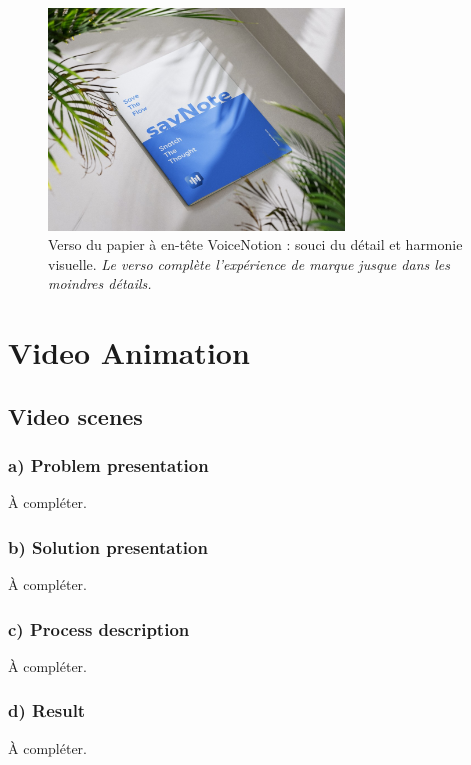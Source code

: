 \begin{figure}[H]
    \centering
    \includegraphics[width=0.7\textwidth]{docs/visual-indentity/pictures/pappier-back.jpg}
    \caption{Verso du papier à en-tête VoiceNotion : souci du détail et harmonie visuelle. \newline\textit{Le verso complète l'expérience de marque jusque dans les moindres détails.}}
\end{figure}


\section{Video Animation}
\subsection{Video scenes}
\subsubsection*{a) Problem presentation}
À compléter.
\subsubsection*{b) Solution presentation}
À compléter.
\subsubsection*{c) Process description}
À compléter.
\subsubsection*{d) Result}
À compléter.

